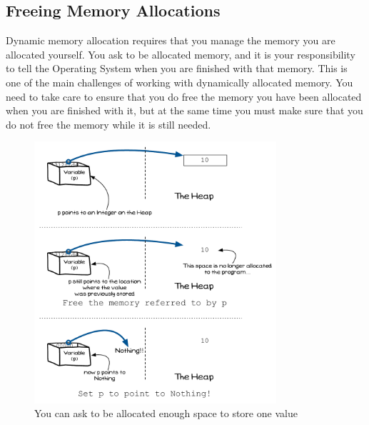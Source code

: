 \clearpage
\subsection{Freeing Memory Allocations} %
\label{sub:freeing_memory_allocations}

Dynamic memory allocation requires that you manage the memory you are allocated yourself. You ask to be allocated memory, and it is your responsibility to tell the Operating System when you are finished with that memory. This is one of the main challenges of working with dynamically allocated memory. You need to take care to ensure that you do free the memory you have been allocated when you are finished with it, but at the same time you must make sure that you do not free the memory while it is still needed.

\begin{figure}[h]
   \centering
   \includegraphics[width=0.8\textwidth]{./topics/dynamic-memory/diagrams/FreeMem} 
   \caption{You can ask to be allocated enough space to store one value}
   \label{fig:free-memory}
\end{figure}




